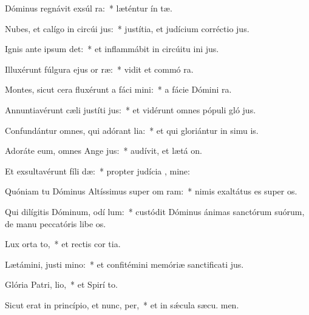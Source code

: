 \item Dóminus regnávit exsúl ra:~* læténtur ín tæ.
\item Nubes, et calígo in circúi jus:~* justítia, et judícium corréctio  jus.
\item Ignis ante ipsum det:~* et inflammábit in circúitu ini jus.
\item Illuxérunt fúlgura ejus or ræ:~* vidit et commó  ra.
\item Montes, sicut cera fluxérunt a fáci mini:~* a fácie Dómini  ra.
\item Annuntiavérunt cæli justíti jus:~* et vidérunt omnes pópuli gló jus.
\item Confundántur omnes, qui adórant lia:~* et qui gloriántur in simu is.
\item Adoráte eum, omnes Ange jus:~* audívit, et lætá  on.
\item Et exsultavérunt fíli dæ:~* propter judícia , mine:
\item Quóniam tu Dóminus Altíssimus super om ram:~* nimis exaltátus es super  os.
\item Qui dilígitis Dóminum, odí lum:~* custódit Dóminus ánimas sanctórum suórum, de manu peccatóris libe os.
\item Lux orta  to,~* et rectis cor tia.
\item Lætámini, justi  mino:~* et confitémini memóriæ sanctificati jus.
\item Glória Patri,  lio,~* et Spirí to.
\item Sicut erat in princípio, et nunc,  per,~* et in sǽcula sæcu. men.
